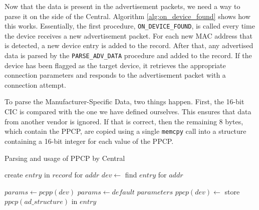 Now that the data is present in the advertisement packets, we need a way to parse it on the side of the Central. Algorithm \ref{alg:on_device_found} shows how this works. Essentially, the first procedure, \texttt{ON\_DEVICE\_FOUND}, is called every time the device receives a new advertisement packet. For each new MAC address that is detected, a new device entry is added to the record. After that, any advertised data is parsed by the \texttt{PARSE\_ADV\_DATA} procedure and added to the record. If the device has been flagged as the target device, it retrieves the appropriate connection parameters and responds to the advertisement packet with a connection attempt.

To parse the Manufacturer-Specific Data, two things happen. First, the 16-bit CIC is compared with the one we have defined ourselves. This ensures that data from another vendor is ignored. If that is correct, then the remaining 8 bytes, which contain the PPCP, are copied using a single \texttt{memcpy} call into a structure containing a 16-bit integer for each value of the PPCP. 

\begin{algorithm}
    \caption{Parsing and usage of PPCP by Central}
    \label{alg:on_device_found}
    \begin{algorithmic}[1] 
                \State create $entry$ in $record$ for $addr$
            \EndIf
            \State $dev \gets $ find $entry$ for $addr$
            \State {}

                    \State $params \gets \textit{pcpp}(dev)$
                \Else
                    \State $params \gets default$ $parameters$
                \EndIf
                \State {}
            \EndIf
        \EndProcedure
                        \State $\textit{ppcp}(dev) \gets $ store $\textit{ppcp}(ad\_structure)$ in $entry$
                    \EndIf
                \EndIf
            \EndFor
        \EndProcedure
    \end{algorithmic}
\end{algorithm}

